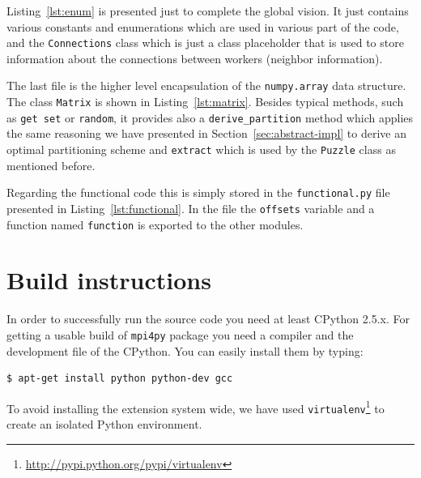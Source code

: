 

Listing~\ref{lst:enum} is presented just to complete the global vision.
It just contains various constants and enumerations which are used in
various part of the code, and the \texttt{Connections} class which is
just a class placeholder that is used to store information about the
connections between workers (neighbor information).




The last file is the higher level encapsulation of the
\texttt{numpy.array} data structure. The class \texttt{Matrix} is shown
in Listing~\ref{lst:matrix}. Besides typical methods, such as
\texttt{get set} or \texttt{random}, it provides also a
\texttt{derive\_partition} method which applies the same reasoning we
have presented in Section~\ref{sec:abstract-impl} to derive an optimal
partitioning scheme and \texttt{extract} which is used by the
\texttt{Puzzle} class as mentioned before.



Regarding the functional code this is simply stored in the
\texttt{functional.py} file presented in Listing~\ref{lst:functional}.
In the file the \texttt{offsets} variable and a function named
\texttt{function} is exported to the other modules.



\section{Build instructions}

In order to successfully run the source code you need at least CPython
2.5.x. For getting a usable build of \texttt{mpi4py} package you need a
compiler and the development file of the CPython. You can easily
install them by typing:

\begin{verbatim}
$ apt-get install python python-dev gcc
\end{verbatim}

To avoid installing the extension system wide, we have used
\texttt{virtualenv}\footnote{\url{http://pypi.python.org/pypi/virtualenv}}
to create an isolated Python environment.

